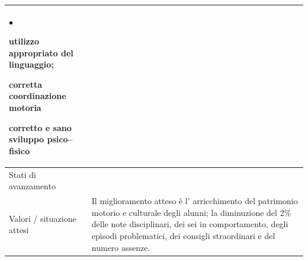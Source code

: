 \documentclass[12pt,a4paper,oneside]{memoir}
\newenvironment{elenco}{\begin{list}{$\bullet$}{%
              \setlength{\leftmargin}{4mm}%
              \setlength{\rightmargin}{1mm}%
               \setlength{\itemindent}{0mm}%
               \setlength{\labelwidth}{2mm}%
               \setlength{\labelsep}{2mm}%
              \setlength{\itemsep}{-\parsep}%
              \setlength{\partopsep}{0pt}%
              \setlength{\topsep}{0pt}%
             \setlength{\parskip}{0pt}%
              }}{\end{list}}
\begin{document}
\begin{footnotesize}
\begin{longtable}{|>{\raggedright}p{2.5cm}|>{\raggedright\arraybackslash}P{10cm}|}
\begin{elenco}
\item utilizzo appropriato del linguaggio;
\item corretta coordinazione motoria
\item corretto e sano sviluppo psico–fisico
\end{elenco}\\[-4mm] \hline
Stati di avanzamento&\\ \hline
Valori / situazione attesi&Il miglioramento atteso è l' arricchimento del patrimonio motorio e culturale degli alunni; la diminuzione del 2\% delle note disciplinari, dei sei in comportamento, degli episodi problematici, dei consigli straordinari e del numero assenze.\\ \hline
\end{longtable}
\end{footnotesize}

\vspace{24pt}
\end{document}

